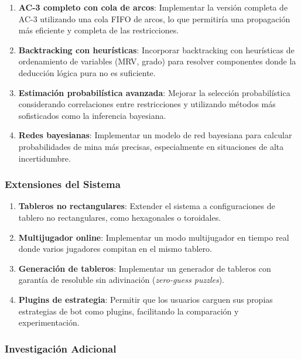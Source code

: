 \documentclass[12pt,a4paper]{article}
\begin{document}
\begin{enumerate}[itemsep=2pt]
    \item \textbf{AC-3 completo con cola de arcos}: Implementar la versión completa de AC-3 utilizando una cola FIFO de arcos, lo que permitiría una propagación más eficiente y completa de las restricciones.

    \item \textbf{Backtracking con heurísticas}: Incorporar backtracking con heurísticas de ordenamiento de variables (MRV, grado) para resolver componentes donde la deducción lógica pura no es suficiente.

    \item \textbf{Estimación probabilística avanzada}: Mejorar la selección probabilística considerando correlaciones entre restricciones y utilizando métodos más sofisticados como la inferencia bayesiana.

    \item \textbf{Redes bayesianas}: Implementar un modelo de red bayesiana para calcular probabilidades de mina más precisas, especialmente en situaciones de alta incertidumbre.
\end{enumerate}

\subsubsection{Extensiones del Sistema}

\begin{enumerate}[itemsep=2pt]
    \item \textbf{Tableros no rectangulares}: Extender el sistema a configuraciones de tablero no rectangulares, como hexagonales o toroidales.

    \item \textbf{Multijugador online}: Implementar un modo multijugador en tiempo real donde varios jugadores compitan en el mismo tablero.

    \item \textbf{Generación de tableros}: Implementar un generador de tableros con garantía de resoluble sin adivinación (\textit{zero-guess puzzles}).

    \item \textbf{Plugins de estrategia}: Permitir que los usuarios carguen sus propias estrategias de bot como plugins, facilitando la comparación y experimentación.
\end{enumerate}

\subsubsection{Investigación Adicional}
\end{document}
